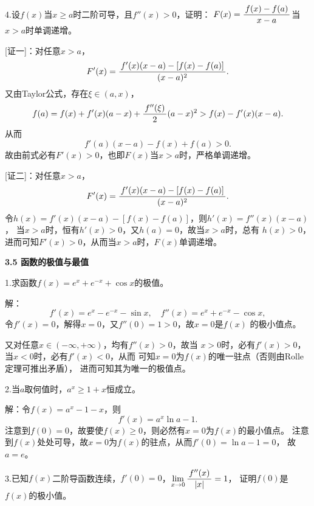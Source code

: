 \bigskip

4.设$f(x)$当$x\geq a$时二阶可导，且$f''(x)>0$，证明：
$F(x)=\displaystyle\frac{\,{f(x)-f(a)}\,}{\,{x-a}\,}$当$x>a$时单调递增。

[证一]：对任意$x>a$，
$$F'(x)=\displaystyle\frac{\,{f'(x)(x-a)-[f(x)-f(a)]}\,}{\,{(x-a)^2}\,}.$$
又由Taylor公式，存在$\xi\in(a,x)$，
$$f(a)=f(x)+f'(x)(a-x)+\displaystyle\frac{\,{f''(\xi)}\,}{\,{2}\,}(a-x)^2
>f(x)-f'(x)(x-a).$$
从而
$$f'(a)(x-a)-f(x)+f(a)>0.$$
故由前式必有$F'(x)>0$，也即$F(x)$当$x>a$时，严格单调递增。\fin

[证二]：对任意$x>a$，
$$F'(x)=\displaystyle\frac{\,{f'(x)(x-a)-[f(x)-f(a)]}\,}{\,{(x-a)^2}\,}.$$
令$h(x)=f'(x)(x-a)-[f(x)-f(a)]$，则$h'(x)=f''(x)(x-a)$，
当$x>a$时，恒有$h'(x)>0$，又$h(a)=0$，故当$x>a$时，总有
$h(x)>0$，进而可知$F'(x)>0$，从而当$x>a$时，$F(x)$单调递增。\fin

\begin{center}
	\bf 3.5 函数的极值与最值
\end{center}

\bigskip

1.求函数$f(x)=e^x+e^{-x}+\cos x$的极值。

解：
$$f'(x)=e^x-e^{-x}-\sin x,\quad f''(x)=e^x+e^{-x}-\cos x,$$
令$f'(x)=0$，解得$x=0$，又$f''(0)=1>0$，故$x=0$是$f(x)$
的极小值点。

又对任意$x\in(-\infty,+\infty)$，均有$f''(x)>0$，故当
$x>0$时，必有$f'(x)>0$，当$x<0$时，必有$f'(x)<0$，从而
可知$x=0$为$f(x)$的唯一驻点（否则由Rolle定理可推出矛盾），
进而可知其为唯一的极值点。
\fin

\bigskip

2.当$a$取何值时，$a^x\geq1+x$恒成立。

% 

解：令$f(x)=a^x-1-x$，则
$$f'(x)=a^x\ln a-1.$$
注意到$f(0)=0$，故要使$f(x)\geq0$，则必然有$x=0$为$f(x)$的最小值点。
注意到$f(x)$处处可导，故$x=0$为$f(x)$的驻点，从而$f'(0)=\ln a-1=0$，
故$a=e$。\fin

\bigskip

3.已知$f(x)$二阶导函数连续，$f'(0)=0$，$\lim\limits_{x\to{0}}\displaystyle\frac{\,{f''(x)}\,}{\,{|x|}\,}=1$，
证明$f(0)$是$f(x)$的极小值。

